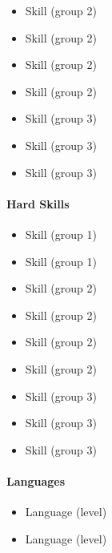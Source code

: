 \documentclass[color]{resume-twopanels}
\begin{document}
\begin{resume}
\begin{leftpanel}
\begin{itemize}
                \item Skill (group 2)
                \item Skill (group 2)
                \item Skill (group 2)
                \item Skill (group 2)
                \vspace{1em}

                \item Skill (group 3)
                \item Skill (group 3)
                \item Skill (group 3)
            \end{itemize}


        \paragraph{Hard Skills}

            \begin{itemize}
                \item Skill (group 1)
                \item Skill (group 1)
                \vspace{1em}

                \item Skill (group 2)
                \item Skill (group 2)
                \item Skill (group 2)
                \item Skill (group 2)
                \vspace{1em}

                \item Skill (group 3)
                \item Skill (group 3)
                \item Skill (group 3)
            \end{itemize}


        \paragraph{Languages}

            \begin{itemize}
                \item Language (level)
                \item Language (level)
            \end{itemize}


\end{leftpanel}
\end{resume}
\end{document}
